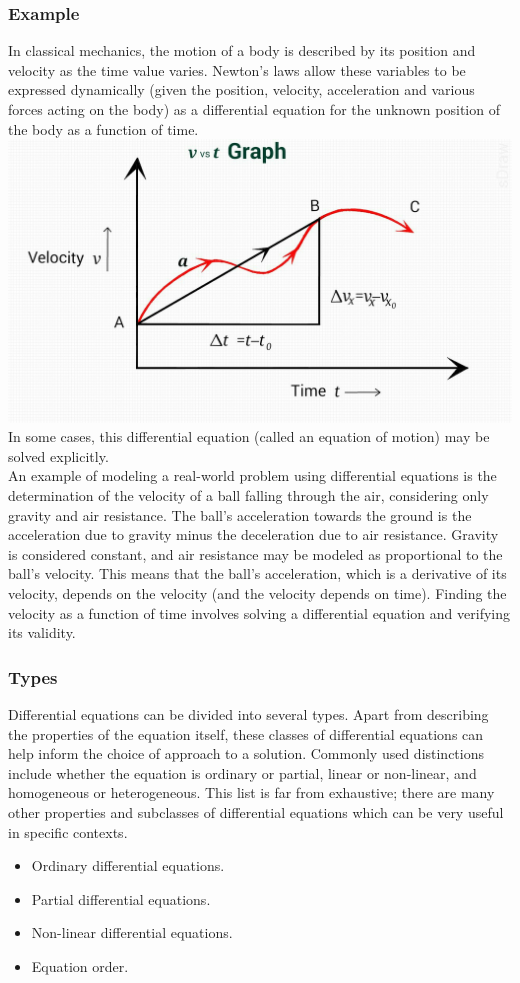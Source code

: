 \documentclass{beamer}
\begin{document}
\begin{frame}[allowframebreaks]
\frametitle {Example}
  In classical mechanics, the motion of a body is described by its position and velocity as the time value varies. 
  Newton's laws allow these variables to be expressed dynamically (given the position, velocity, acceleration and various forces acting on the body) 
  as a differential equation for the unknown position of the body as a function of time.
  \includegraphics[width=.7\linewidth]{equationOfMotion}
  In some cases, this differential equation (called an equation of motion) may be solved explicitly.
  \\\framebreak
  An example of modeling a real-world problem using differential equations is the determination of the velocity of a ball falling through the air, considering only gravity and air resistance. 
  The ball's acceleration towards the ground is the acceleration due to gravity minus the deceleration due to air resistance. Gravity is considered constant, and air resistance may be modeled as proportional to the ball's velocity. 
  This means that the ball's acceleration, which is a derivative of its velocity, depends on the velocity (and the velocity depends on time). Finding the velocity as a function of time involves solving a differential equation and verifying its validity.

\end{frame}

\begin{frame}[allowframebreaks]
\frametitle {Types}
  Differential equations can be divided into several types. Apart from describing the properties of the equation itself, these classes of differential equations can help inform the choice of approach to a solution. 
  Commonly used distinctions include whether the equation is ordinary or partial, linear or non-linear, and homogeneous or heterogeneous. This list is far from exhaustive; 
  there are many other properties and subclasses of differential equations which can be very useful in specific contexts.

  \begin{itemize}
    \item Ordinary differential equations.
    \item Partial differential equations.
    \item Non-linear differential equations.
    \item Equation order.      
    \end{itemize}
\end{frame}
\end{document}
